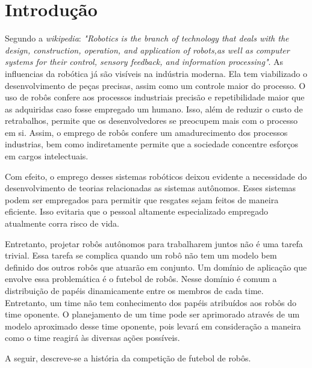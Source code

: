 \chapter{Introdução}


Segundo a \textit{wikipedia}:
\textit{"Robotics is the branch of technology that deals with the design, construction,
operation, and application of robots,as well as computer systems for their control,
sensory feedback, and information processing"}. As influencias da robótica já
são visíveis na indústria moderna. Ela tem viabilizado o desenvolvimento de peças
precisas, assim como um controle maior do processo. O uso de robôs confere aos
processos industriais precisão e repetibilidade maior que as adquiridas caso
fosse empregado um humano. Isso, além de reduzir o custo de retrabalhos, permite
que os desenvolvedores se preocupem mais com o processo em si. Assim, o emprego
de robôs confere um amadurecimento dos processos industrias, bem como indiretamente
permite que a sociedade concentre esforços em cargos intelectuais.

Com efeito, o emprego desses sistemas robóticos deixou evidente a necessidade do
desenvolvimento de teorias relacionadas as sistemas autônomos. Esses sistemas podem
ser empregados para permitir que resgates sejam feitos de maneira eficiente. Isso
evitaria que o pessoal altamente especializado empregado atualmente corra risco de vida.

Entretanto, projetar robôs autônomos para trabalharem juntos não é uma tarefa trivial. Essa
tarefa se complica quando um robô não tem um modelo bem definido dos outros robôs que atuarão em
conjunto. Um domínio de aplicação que envolve essa problemática é o futebol de robôs.
Nesse domínio é comum a distribuição de papéis dinamicamente entre os membros de cada
time. Entretanto, um time não tem conhecimento dos papéis atribuídos aos robôs
do time oponente. O planejamento de um time pode ser aprimorado através de um modelo
aproximado desse time oponente, pois levará em consideração a maneira como o
time reagirá às diversas ações possíveis.

A seguir, descreve-se a história da competição de futebol de robôs.

